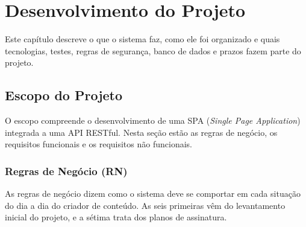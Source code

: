 \chapter{Desenvolvimento do Projeto}

Este capítulo descreve o que o sistema faz, como ele foi organizado e quais tecnologias, testes, regras de segurança, banco de dados e prazos fazem parte do projeto.

\section{Escopo do Projeto}

O escopo compreende o desenvolvimento de uma SPA (\textit{Single Page Application}) integrada a uma API RESTful. Nesta seção estão as regras de negócio, os requisitos funcionais e os requisitos não funcionais.

\subsection{Regras de Negócio (RN)}

As regras de negócio dizem como o sistema deve se comportar em cada situação do dia a dia do criador de conteúdo. As seis primeiras vêm do levantamento inicial do projeto, e a sétima trata dos planos de assinatura.


